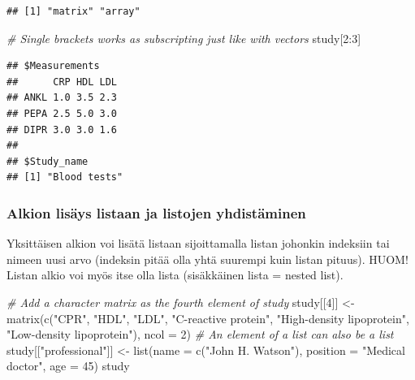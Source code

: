 \documentclass[
]{book}
\newenvironment{Shaded}{\begin{snugshade}}{\end{snugshade}}
\newcommand{\AttributeTok}[1]{\textcolor[rgb]{0.77,0.63,0.00}{#1}}
\newcommand{\CommentTok}[1]{\textcolor[rgb]{0.56,0.35,0.01}{\textit{#1}}}
\newcommand{\DecValTok}[1]{\textcolor[rgb]{0.00,0.00,0.81}{#1}}
\newcommand{\FunctionTok}[1]{\textcolor[rgb]{0.00,0.00,0.00}{#1}}
\newcommand{\NormalTok}[1]{#1}
\newcommand{\OtherTok}[1]{\textcolor[rgb]{0.56,0.35,0.01}{#1}}
\newcommand{\SpecialCharTok}[1]{\textcolor[rgb]{0.00,0.00,0.00}{#1}}
\newcommand{\StringTok}[1]{\textcolor[rgb]{0.31,0.60,0.02}{#1}}
\begin{document}
\begin{verbatim}
## [1] "matrix" "array"
\end{verbatim}

\begin{Shaded}
\begin{Highlighting}[]
\CommentTok{\# Single brackets works as subscripting just like with vectors}
\NormalTok{study[}\DecValTok{2}\SpecialCharTok{:}\DecValTok{3}\NormalTok{]}
\end{Highlighting}
\end{Shaded}

\begin{verbatim}
## $Measurements
##      CRP HDL LDL
## ANKL 1.0 3.5 2.3
## PEPA 2.5 5.0 3.0
## DIPR 3.0 3.0 1.6
## 
## $Study_name
## [1] "Blood tests"
\end{verbatim}

\hypertarget{alkion-lisuxe4ys-listaan-ja-listojen-yhdistuxe4minen}{%
\subsubsection{Alkion lisäys listaan ja listojen yhdistäminen}\label{alkion-lisuxe4ys-listaan-ja-listojen-yhdistuxe4minen}}

Yksittäisen alkion voi lisätä listaan sijoittamalla listan johonkin indeksiin tai nimeen uusi arvo (indeksin pitää olla yhtä suurempi kuin listan pituus). HUOM! Listan alkio voi myös itse olla lista (sisäkkäinen lista = nested list).

\begin{Shaded}
\begin{Highlighting}[]
\CommentTok{\# Add a character matrix as the fourth element of study}
\NormalTok{study[[}\DecValTok{4}\NormalTok{]] }\OtherTok{\textless{}{-}} \FunctionTok{matrix}\NormalTok{(}\FunctionTok{c}\NormalTok{(}\StringTok{"CPR"}\NormalTok{, }\StringTok{"HDL"}\NormalTok{, }\StringTok{"LDL"}\NormalTok{,}
                       \StringTok{"C{-}reactive protein"}\NormalTok{, }\StringTok{"High{-}density lipoprotein"}\NormalTok{,}
                       \StringTok{"Low{-}density lipoprotein"}\NormalTok{),}
                     \AttributeTok{ncol =} \DecValTok{2}\NormalTok{)}
\CommentTok{\# An element of a list can also be a list}
\NormalTok{study[[}\StringTok{"professional"}\NormalTok{]] }\OtherTok{\textless{}{-}} \FunctionTok{list}\NormalTok{(}\AttributeTok{name =} \FunctionTok{c}\NormalTok{(}\StringTok{"John H. Watson"}\NormalTok{),}
                                \AttributeTok{position =} \StringTok{"Medical doctor"}\NormalTok{,}
                                \AttributeTok{age =} \DecValTok{45}\NormalTok{)}
\NormalTok{study}
\end{Highlighting}
\end{Shaded}
\end{document}
